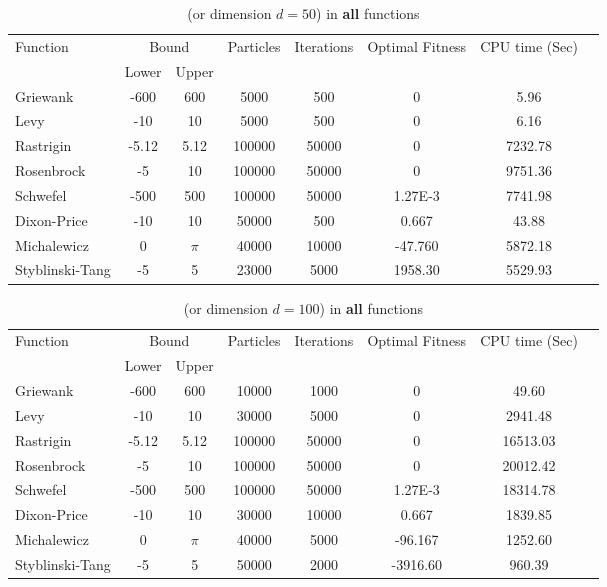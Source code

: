 \documentclass[12pt]{article}
\begin{document}
	
	\begin{table}[H]
		\caption{ (or dimension $d=50$) in \textbf{all} functions}
		\label{table:1}
		\centering
		\begin{tabular}{l c c c c c c c}
			\hline
			Function &  \multicolumn{2}{c}{Bound} & Particles & Iterations &  Optimal Fitness & CPU time (Sec) \\
			& Lower& Upper&&&\\
			\hline
			Griewank  		&  -600   & 600 	&5000 &500 &0 &5.96 &\\
			Levy 	  		&  -10    & 10 		&5000 &500 &0 &6.16 &\\
			Rastrigin 		&  -5.12  & 5.12 	&100000 &50000 &0 &7232.78 &\\
			Rosenbrock		&  -5     & 10 		&100000 &50000 &0 &9751.36 &\\
			Schwefel 	 	&  -500   & 500 	&100000 &50000 &1.27E-3 &7741.98 &\\
			Dixon-Price 	&   -10	  & 10 		&50000 &500 &0.667 &43.88 &\\
			Michalewicz 	&   0 	  & $\pi$ 	&40000 &10000 &-47.760 &5872.18 &\\
			Styblinski-Tang & -5 	  & 5  		&23000 &5000 &1958.30 &5529.93 &\\
			\hline
		\end{tabular}
	\end{table}
	
	\begin{table}[H]
		\caption{ (or dimension $d=100$) in \textbf{all} functions}
		\label{table:1}
		\centering
		\begin{tabular}{l c c c c c c c}
			\hline
			Function &  \multicolumn{2}{c}{Bound} & Particles & Iterations &  Optimal Fitness & CPU time (Sec) \\
			& Lower& Upper&&&\\
			\hline
			Griewank  		&  -600   & 600 		&10000 &1000 &0 &49.60 &\\
			Levy 	  		&  -10    & 10 		&30000 &5000 &0 &2941.48 &\\
			Rastrigin 		&  -5.12  & 5.12 	&100000 &50000 &0 &16513.03 &\\
			Rosenbrock		&  -5     & 10 		&100000 &50000 &0 &20012.42 &\\
			Schwefel 	 	&  -500   & 500 	&100000 &50000 &1.27E-3 &18314.78 &\\
			Dixon-Price 	&   -10	  & 10 		&30000 &10000 &0.667 &1839.85 &\\
			Michalewicz 	&   0 	  & $\pi$ 	&40000 &5000 &-96.167 &1252.60 &\\
			Styblinski-Tang & -5 	  & 5  		&50000 &2000 &-3916.60 &960.39 &\\
			\hline
		\end{tabular}
	\end{table}
	
\end{document}
